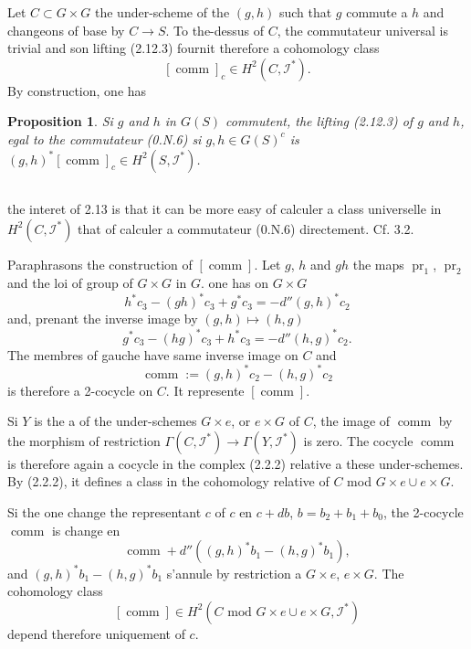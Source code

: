 \documentclass[11pt,a4paper]{article}
\theoremstyle{plain}
\newtheorem{proposition}[theorem]{Proposition}
\theoremstyle{definition}
\DeclareMathOperator{\pr}{pr}
\DeclareMathOperator{\comm}{comm}
\begin{document}
Let $C \subset G \times G$ the under-scheme of the $(g, h)$ such that $g$ commute a $h$ and changeons of base by $C \to S$. To the-dessus of $C$, the commutateur universal is trivial and son lifting (2.12.3) fournit therefore a cohomology class
\begin{equation}\label{2.12.4}
[\comm]_c \in H^2(C, \mathscr{I}^*).
\end{equation}
By construction, one has
\begin{proposition}\label{2.13}
Si $g$ and $h$ in $G(S)$ commutent, the lifting (2.12.3) of $g$ and $h$, egal to the commutateur (0.N.6) si $g, h \in G(S)^c$ is $(g, h)^*[\comm]_c \in H^2(S, \mathscr{I}^*)$.
\end{proposition}

\subsection{}\label{2.14}

the interet of 2.13 is that it can be more easy of calculer a class universelle in $H^2(C, \mathscr{I}^*)$ that of calculer a commutateur (0.N.6) directement. Cf. 3.2.

Paraphrasons the construction of $[\comm]$. Let $g$, $h$ and $gh$ the maps $\pr_1$, $\pr_2$ and the loi of group of $G \times G$ in $G$. one has on $G \times G$
\[
h^* c_3 - (gh)^* c_3 + g^* c_3 = -d''(g, h)^* c_2
\]
and, prenant the inverse image by $(g, h) \mapsto (h, g)$
\[
g^* c_3 - (hg)^* c_3 + h^* c_3 = -d''(h, g)^* c_2.
\]
The membres of gauche have same inverse image on $C$ and
\begin{equation}\label{2.14.1}
\comm := (g, h)^* c_2 - (h, g)^* c_2
\end{equation}
is therefore a 2-cocycle on $C$. It represente $[\comm]$.

Si $Y$ is the a of the under-schemes $G \times e$, or $e \times G$ of $C$, the image of $\comm$ by the morphism of restriction $\Gamma(C, \mathscr{I}^*) \to \Gamma(Y, \mathscr{I}^*)$ is zero. The cocycle $\comm$ is therefore again a cocycle in the complex (2.2.2) relative a these under-schemes. By (2.2.2), it defines a class in the cohomology relative of $C$ mod $G \times e \cup e \times G$.

Si the one change the representant $c$ of $c$ en $c + db$, $b = b_2 + b_1 + b_0$, the 2-cocycle $\comm$ is change en
\[
\comm + d''((g, h)^* b_1 - (h, g)^* b_1),
\]
and $(g, h)^* b_1 - (h, g)^* b_1$ s'annule by restriction a $G \times e$, $e \times G$. The cohomology class
\begin{equation}\label{2.14.2}
[\comm] \in H^2(C \text{ mod } G \times e \cup e \times G, \mathscr{I}^*)
\end{equation}
depend therefore uniquement of $c$.
\end{document}
